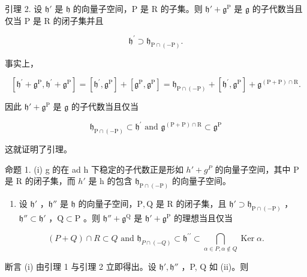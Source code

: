 引理 2. 设 \(\mathfrak{h}'\) 是 \(\mathfrak{h}\) 的向量子空间，\(\mathrm{P}\) 是 \(\mathrm{R}\) 的子集。则 \(\mathfrak{h}' + \mathfrak{g}^{\mathrm{P}}\) 是 \(\mathfrak{g}\) 的子代数当且仅当 \(\mathrm{P}\) 是 \(\mathrm{R}\) 的闭子集并且

\[
\mathfrak {h} ^ {\prime} \supset \mathfrak {h} _ {\mathrm{P} \cap (- \mathrm{P})}.
\]

事实上，

\[
[ \mathfrak {h} ^ {\prime} + \mathfrak {g} ^ {\mathrm{P}}, \mathfrak {h} ^ {\prime} + \mathfrak {g} ^ {\mathrm{P}} ] = [ \mathfrak {h} ^ {\prime}, \mathfrak {g} ^ {\mathrm{P}} ] + [ \mathfrak {g} ^ {\mathrm{P}}, \mathfrak {g} ^ {\mathrm{P}} ] = \mathfrak {h} _ {\mathrm{P} \cap (- \mathrm{P})} + [ \mathfrak {h} ^ {\prime}, \mathfrak {g} ^ {\mathrm{P}} ] + \mathfrak {g} ^ {(\mathrm{P} + \mathrm{P}) \cap \mathrm{R}}.
\]

因此 \(\mathfrak{h}' + \mathfrak{g}^{\mathrm{P}}\) 是 \(\mathfrak{g}\) 的子代数当且仅当

\[
\mathfrak {h} _ {\mathrm{P} \cap (- \mathrm{P})} \subset \mathfrak {h} ^ {\prime} \text { and } \mathfrak {g} ^ {(\mathrm{P} + \mathrm{P}) \cap \mathrm{R}} \subset \mathfrak {g} ^ {\mathrm{P}}
\]

这就证明了引理。

命题 1. (i) g 的在 ad h 下稳定的子代数正是形如 \(h' + g^{P}\) 的向量子空间，其中 P 是 R 的闭子集，而 \(h'\) 是 h 的包含 \(\mathfrak{h}_{\mathrm{P}\cap(-\mathrm{P})}\) 的向量子空间。

\begin{enumerate}
\def\labelenumi{(\roman{enumi})}
\setcounter{enumi}{1}
\tightlist
\item
  设 \(\mathfrak{h}'\) ，\(\mathfrak{h}''\) 是 \(\mathfrak{h}\) 的向量子空间，\(\mathrm{P},\mathrm{Q}\) 是 \(\mathrm{R}\) 的闭子集，且 \(\mathfrak{h}'\supset \mathfrak{h}_{\mathrm{P}\cap (-\mathrm{P})}\) ，\(\mathfrak{h}''\subset \mathfrak{h}'\) ，\(\mathrm{Q}\subset \mathrm{P}\) 。则 \(\mathfrak{h}'' + \mathfrak{g}^{\mathrm{Q}}\) 是 \(\mathfrak{h}' + \mathfrak{g}^{\mathrm{P}}\) 的理想当且仅当
\end{enumerate}

\[
(P + Q) \cap R \subset Q \text { and } \mathfrak {h} _ {P \cap (- Q)} \subset \mathfrak {h} ^ {\prime \prime} \subset \bigcap_ {\alpha \in P, \alpha \notin Q} \operatorname{Ker} \alpha .
\]

断言 (i) 由引理 1 与引理 2 立即得出。设 \(\mathfrak{h}',\mathfrak{h}''\) ，P, Q 如 (ii)。则

